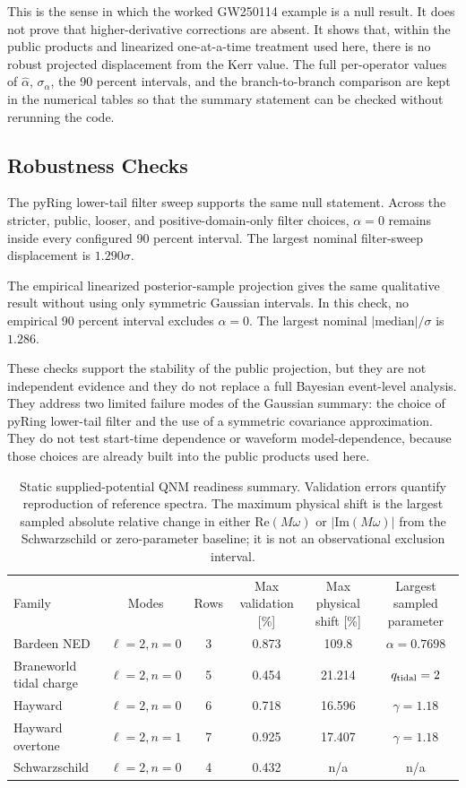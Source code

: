 \documentclass[aps,prd,10pt,twocolumn,nofootinbib,superscriptaddress]{revtex4-2}
\begin{document}
This is the sense in which the worked GW250114 example is a null result. It
does not prove that higher-derivative corrections are absent. It shows that,
within the public products and linearized one-at-a-time treatment used here,
there is no robust projected displacement from the Kerr value. The full
per-operator values of $\hat{\alpha}$, $\sigma_{\alpha}$, the 90 percent intervals,
and the branch-to-branch comparison are kept in the numerical tables so that
the summary statement can be checked without rerunning the code.

\subsection{Robustness Checks}

The pyRing lower-tail filter sweep supports the same null statement. Across
the stricter, public, looser, and positive-domain-only filter choices,
$\alpha=0$ remains inside every configured 90 percent interval. The largest
nominal filter-sweep displacement is $1.290\sigma$.

The empirical linearized posterior-sample projection gives the same qualitative
result without using only symmetric Gaussian intervals. In this check, no
empirical 90 percent interval excludes $\alpha=0$. The largest nominal
$|\mathrm{median}|/\sigma$ is $1.286$.

These checks support the stability of the public projection, but they are not
independent evidence and they do not replace a full Bayesian event-level
analysis. They address two limited failure modes of the Gaussian summary: the
choice of pyRing lower-tail filter and the use of a symmetric covariance
approximation. They do not test start-time dependence or waveform
model-dependence, because those choices are already built into the public
products used here.

\begin{table}
\caption{Static supplied-potential QNM readiness summary. Validation errors quantify reproduction of reference spectra. The maximum physical shift is the largest sampled absolute relative change in either $\mathrm{Re}(M\omega)$ or $|\mathrm{Im}(M\omega)|$ from the Schwarzschild or zero-parameter baseline; it is not an observational exclusion interval.}
\label{tab:static_readiness_summary}
\begin{ruledtabular}
\begin{tabular}{lccccc}
Family & Modes & Rows & Max validation [\%] & Max physical shift [\%] & Largest sampled parameter \\
Bardeen NED & $\ell=2,n=0$ & 3 & 0.873 & 109.8 & $\alpha=0.7698$ \\
Braneworld tidal charge & $\ell=2,n=0$ & 5 & 0.454 & 21.214 & $q_{\rm tidal}=2$ \\
Hayward & $\ell=2,n=0$ & 6 & 0.718 & 16.596 & $\gamma=1.18$ \\
Hayward overtone & $\ell=2,n=1$ & 7 & 0.925 & 17.407 & $\gamma=1.18$ \\
Schwarzschild & $\ell=2,n=0$ & 4 & 0.432 & n/a & n/a \\
\end{tabular}
\end{ruledtabular}
\end{table}
\end{document}
